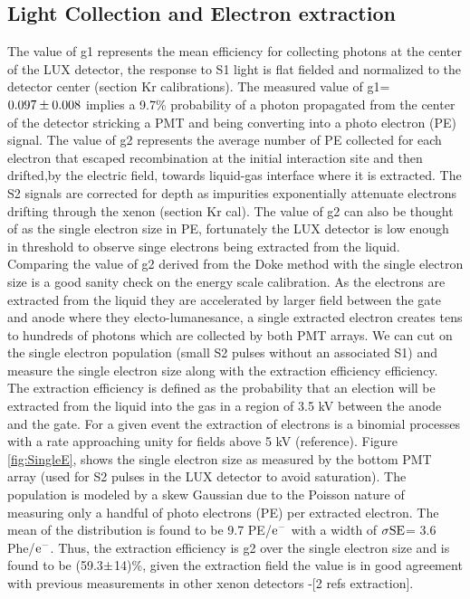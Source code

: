 \subsection{Light Collection and Electron extraction}

The value of g1 represents the mean efficiency for collecting photons at the center of the LUX detector, the response to S1 light is flat fielded and normalized to the detector center (section Kr calibrations). The measured value of g1= $\rm0.097\pm0.008$ implies a 9.7\% probability of a photon propagated from the center of the detector stricking a PMT and being converting into a photo electron (PE) signal. The value of g2 represents the average number of PE collected for each electron that escaped recombination at the initial interaction site and then drifted,by the electric field, towards liquid-gas interface where it is extracted. The S2 signals are corrected for depth as impurities exponentially attenuate electrons drifting through the xenon (section Kr cal). The value of g2 can also be thought of as the single electron size in PE, fortunately the LUX detector is low enough in threshold to observe singe electrons being extracted from the liquid. Comparing the value of g2 derived from the Doke method with the single electron size is a good sanity check on the energy scale calibration. As the electrons are extracted from the liquid they are accelerated by larger field between the gate and anode where they electo-lumanesance, a single extracted electron creates tens to hundreds of photons which are collected by both PMT arrays. We can cut on the single electron population (small S2 pulses without an associated S1) and measure the single electron size along with the extraction efficiency efficiency. The extraction efficiency is defined as the probability that an election will be extracted from the liquid into the gas in a region of 3.5 kV between the anode and the gate. For a given event the extraction of electrons is a binomial processes with a rate approaching unity for fields above 5 kV (reference). Figure \ref{fig:SingleE}, shows the single electron size as measured by the bottom PMT array (used for S2 pulses in the LUX detector to avoid saturation). The population is modeled by a skew Gaussian due to the Poisson nature of measuring only a handful of photo electrons (PE) per extracted electron. The mean of the distribution is found to be 9.7 PE/$\rm e^-$ with a width of $\rm \sigma SE$= 3.6 Phe/$\rm e^-$. Thus, the extraction efficiency is g2 over the single electron size and is found to be (59.3$\rm \pm$14)\%, given the extraction field the value is in good agreement with previous measurements in other xenon detectors -[2 refs extraction].

